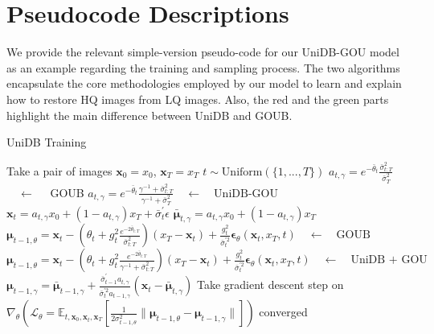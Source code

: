 \section{Pseudocode Descriptions}\label{append_pseudo}
We provide the relevant simple-version pseudo-code for our UniDB-GOU model as an example regarding the training and sampling process. The two algorithms encapsulate the core methodologies employed by our model to learn and explain how to restore HQ images from LQ images. Also, the red and the green parts highlight the main difference between UniDB and GOUB.




\begin{algorithm}[h]
   \caption{UniDB Training}
   \label{training}
\begin{algorithmic}

    \REPEAT
        \STATE Take a pair of images $\mathbf{x}_0 = x_0$, $\mathbf{x}_T = x_T$
        \STATE  $t \sim \text{Uniform}(\{ 1, ..., T\})$
        \STATE \colorbox{red!30}{$a_{t, \gamma} = e^{-\bar{\theta}_{t}}${$\frac{\bar{\sigma}^2_{t:T}}{\bar{\sigma}^2_{T}}$} $\quad \leftarrow \quad$ GOUB }
        \STATE \colorbox{green!30}{$a_{t, \gamma} = e^{-\bar{\theta}_{t}}\frac{\gamma^{-1}+\bar{\sigma}^2_{t:T}}{\gamma^{-1}+\bar{\sigma}^2_{T}}\quad \leftarrow \quad \text{UniDB-GOU} $  }
        \STATE $\mathbf{x}_t = a_{t, \gamma} x_0 + \left(1 - a_{t, \gamma}\right) x_T + \bar{\sigma}_{t}^{\prime} \epsilon$
        \STATE $\bar{\boldsymbol{\mu}}_{t, \gamma} = a_{t, \gamma} x_0 + \left(1 - a_{t, \gamma}\right) x_T$
        \STATE \colorbox{red!30}{$\boldsymbol{\mu}_{t-1, \theta} = \mathbf{x}_{t} - \left( \theta_t + g^2_t \frac{e^{-2\bar{\theta}_{t:T}}}{\bar{\sigma}^2_{t:T}}\right) (x_T - \mathbf{x}_t) + \frac{g^2_t}{\bar{\sigma}_{t}^{\prime 2}} \boldsymbol{\epsilon}_{\theta}(\mathbf{x}_t, x_T, t) \quad \leftarrow \quad \text{GOUB}$} 
        \STATE \colorbox{green!30} {$\boldsymbol{\mu}_{t-1, \theta} = \mathbf{x}_{t} - \left( \theta_t + g^2_t \frac{e^{-2\bar{\theta}_{t:T}}}{\gamma^{-1} + \bar{\sigma}^2_{t:T}}\right) (x_T - \mathbf{x}_t) + \frac{g^2_t}{\bar{\sigma}_{t}^{\prime 2}} \boldsymbol{\epsilon}_{\theta}(\mathbf{x}_t, x_T, t) \quad \leftarrow \quad \text{UniDB + GOU}$} 
        \STATE $\boldsymbol{\mu}_{t-1, \gamma} = \bar{\boldsymbol{\mu}}_{t-1, \gamma} + \frac{\bar{\sigma}_{t-1}^{\prime}a_{t, \gamma}}{\bar{\sigma}_{t}^{\prime2}a_{t-1, \gamma}} (\mathbf{x}_t - \bar{\boldsymbol{\mu}}_{t, \gamma})$
        \STATE Take gradient descent step on $\nabla_{\theta} \left( \mathcal{L}_{\theta} = \mathbb{E}_{t, \mathbf{x}_0, \mathbf{x}_t, \mathbf{x}_T} \left[ \frac{1}{2\sigma_{t-1, \theta}^2} \| \boldsymbol{\mu}_{t-1, \theta} - \boldsymbol{\mu}_{t-1, \gamma} \| \right] \right)$
    \UNTIL converged
\end{algorithmic}



\end{algorithm}




